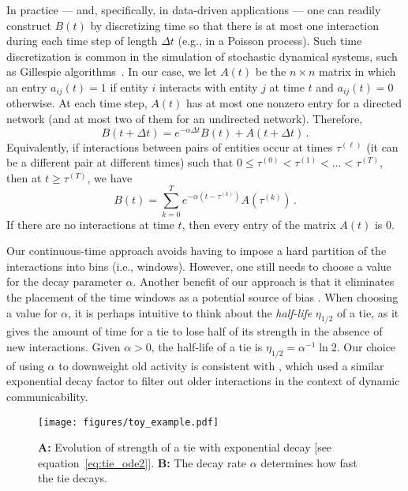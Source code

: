 \documentclass[journal,transmag]{IEEEtran}
\newcommand{\tdt}{t+\Delta t}
\begin{document}
In practice --- and, specifically, in data-driven applications --- one
can readily construct $B(t)$ by discretizing time so that there is at
most one interaction during each time step of length $\Delta t$ (e.g.,
in a Poisson process). Such time discretization is common in the
simulation of stochastic dynamical systems, such as Gillespie
algorithms~\cite{Erban2007,porter2016dynamical,vester2015}. In our
case, we let ${A}(t)$ be the $n \times n$ matrix in which an entry
$a_{ij}(t)=1$ if entity $i$ interacts with entity $j$ at time $t$ and
$a_{ij}(t)=0$ otherwise. At each time step, $A(t)$ has at most one
nonzero entry for a directed network (and at most two of them for an
undirected network). Therefore,
\begin{equation}
	  {B}(\tdt)  = e^{-\alpha \Delta t}B(t) + A(\tdt)\,.
  \label{eq:Bupdate}
\end{equation}
Equivalently, if interactions between pairs of entities occur at times
$\tau^{\left(\ell\right)}$ (it can be a different pair at different
times) such that $0\leq \tau^{\left(0\right)} < \tau^{\left(1\right)}
< \ldots < \tau^{\left(T\right)}$, then at $t\geq
\tau^{\left(T\right)}$, we have
\begin{equation}
	  B(t) = \sum_{k = 0}^T e^{-\alpha (t - \tau^{\left(k\right)})} A(\tau^{\left(k\right)})\,.
  \label{eq:B_summation}
\end{equation}
If there are no interactions at time $t$, then every entry of the matrix $A(t)$ is $0$.

Our continuous-time approach avoids having to impose a hard partition
of the interactions into bins (i.e., windows). 
However, one still needs to choose a
value for the decay parameter $\alpha$.  Another benefit of our
approach is that it eliminates the placement of the time windows as a
potential source of bias \cite{kivela2015}. When choosing a value for
$\alpha$, it is perhaps intuitive to think about the {\it half-life}
$\eta_{1/2}$ of a tie, as it gives the amount of time for a tie to
lose half of its strength in the absence of new interactions. Given
$\alpha >0$, the half-life of a tie is $\eta_{1/2} =
\alpha^{-1}\ln{2}$. Our choice of using $\alpha$ to downweight old
activity is consistent with \cite{grindrod2013matrix, Grindrod2014},
which used a similar exponential decay factor to filter out older
interactions in the context of dynamic communicability.


\begin{figure}[tp]
  \centerline{\texttt{[image: figures/toy\_example.pdf]}}
  \caption{{\bf A:} Evolution of strength of a tie with exponential decay [see equation~\eqref{eq:tie_ode2}]. {\bf B:} The decay rate
    $\alpha$ determines how fast the tie decays.
    }
  \label{fig:toy_example}
\end{figure}
\end{document}
